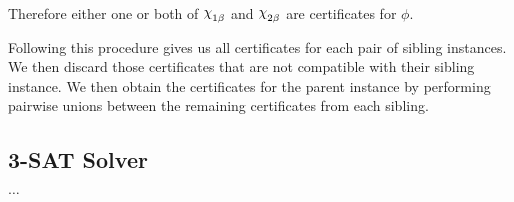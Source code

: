 Therefore either one or both of $\rchi_{1\beta}$ and $\rchi_{2\beta}$ are certificates for $\phi$.

Following this procedure gives us all certificates for each pair of sibling instances.
We then discard those certificates that are not compatible with their sibling instance.
We then obtain the certificates for the parent instance by performing pairwise unions between the remaining certificates from each sibling.


\subsection{3-SAT Solver}
\label{subsec:3-sat-solver}

$\dots$
